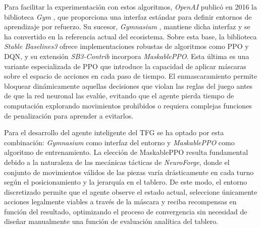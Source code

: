 Para facilitar la experimentación con estos algoritmos, \textit{OpenAI} publicó en 2016 la biblioteca \textit{Gym} \cite{Brockman2016}, que proporciona una interfaz estándar para definir entornos de aprendizaje por refuerzo. Su sucesor, \textit{Gymnasium} \cite{Towers2023}, mantiene dicha interfaz y se ha convertido en la referencia actual del ecosistema. Sobre esta base, la biblioteca \textit{Stable Baselines3} \cite{Raffin2021} ofrece implementaciones robustas de algoritmos como PPO y DQN, y su extensión \textit{SB3-Contrib} incorpora \textit{MaskablePPO}. Esta última es una variante especializada de PPO que introduce la capacidad de aplicar máscaras sobre el espacio de acciones en cada paso de tiempo. El enmascaramiento permite bloquear dinámicamente aquellas decisiones que violan las reglas del juego antes de que la red neuronal las evalúe, evitando que el agente pierda tiempo de computación explorando movimientos prohibidos o requiera complejas funciones de penalización para aprender a evitarlos.

Para el desarrollo del agente inteligente del TFG se ha optado por esta combinación: \textit{Gymnasium} como interfaz del entorno y \textit{MaskablePPO} como algoritmo de entrenamiento. La elección de MaskablePPO resulta fundamental debido a la naturaleza de las mecánicas tácticas de \textit{NeuroForge}, donde el conjunto de movimientos válidos de las piezas varía drásticamente en cada turno según el posicionamiento y la jerarquía en el tablero. De este modo, el entorno discretizado permite que el agente observe el estado actual, seleccione únicamente acciones legalmente viables a través de la máscara y reciba recompensas en función del resultado, optimizando el proceso de convergencia sin necesidad de diseñar manualmente una función de evaluación analítica del tablero.
